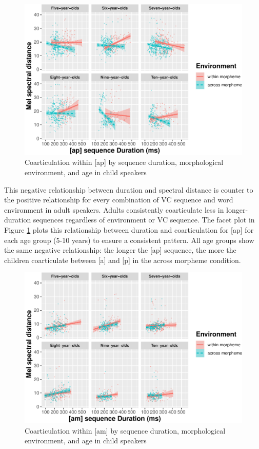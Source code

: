 \documentclass[
]{article}
\begin{document}
\begin{figure}
\centering
\includegraphics{3_ch3_results_files/figure-latex/child-facet-ap-1.pdf}
\caption{\label{fig:child-facet-ap}Coarticulation within {[}ap{]} by sequence duration, morphological environment, and age in child speakers}
\end{figure}

This negative relationship between duration and spectral distance is counter to the positive relationship for every combination of VC sequence and word environment in adult speakers. Adults consistently coarticulate less in longer-duration sequences regardless of environment or VC sequence. The facet plot in Figure \ref{fig:child-facet-ap} plots this relationship between duration and coarticulation for {[}ap{]} for each age group (5-10 years) to ensure a consistent pattern. All age groups show the same negative relationship: the longer the {[}ap{]} sequence, the more the children coarticulate between {[}a{]} and {[}p{]} in the across morpheme condition.

\begin{figure}
\centering
\includegraphics{3_ch3_results_files/figure-latex/child-facet-am-1.pdf}
\caption{\label{fig:child-facet-am}Coarticulation within {[}am{]} by sequence duration, morphological environment, and age in child speakers}
\end{figure}
\end{document}
